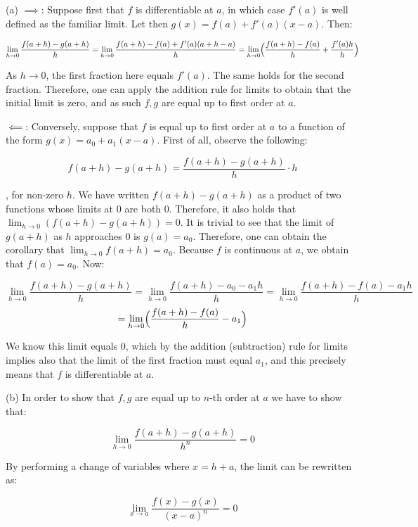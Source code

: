 \begin{solution}

    (a) $\implies$: Suppose first that $f$ is differentiable at $a$, in which case $f'(a)$ is well defined as the familiar limit. Let then $g(x) = f(a) + f'(a)(x - a)$. Then:

    $$\lim_{h \rightarrow 0} \frac{f(a + h) - g(a+h)}{h} = \lim_{h \rightarrow 0} \frac{f(a+h) - f(a) + f'(a)(a + h - a)}{h} = \lim_{h \rightarrow 0}\Bigl( \frac{f(a+h) - f(a)}{h} + \frac{f'(a)h}{h}\Bigr)$$

    As $h \rightarrow 0$, the first fraction here equals $f'(a)$. The same holds for the second fraction. Therefore, one can apply the addition rule for limits to obtain that the initial limit is zero, and as such $f, g$ are equal up to first order at $a$.

    $\impliedby$: Conversely, suppose that $f$ is equal up to first order at $a$ to a function of the form $g(x) = a_0 + a_1(x -a)$. First of all, observe the following:

    $$f(a+h) - g(a+h) = \frac{f(a+h) - g(a+h)}{h}\cdot h$$

    , for non-zero $h$. We have written $f(a+h) - g(a+h)$ as a product of two functions whose limits at 0 are both 0. Therefore, it also holds that $\lim_{h \rightarrow 0} (f(a+h) - g(a+h)) = 0$. It is trivial to see that the limit of $g(a+h)$ as $h$ approaches 0 is $g(a) = a_0$. Therefore, one can obtain the corollary that $\lim_{h \rightarrow 0} f(a+h) = a_0$. Because $f$ is continuous at $a$, we obtain that $f(a) = a_0$. Now:

    $$\lim_{h \rightarrow 0} \frac{f(a+h) - g(a+h)}{h} = \lim_{h \rightarrow 0} \frac{f(a+h) - a_0 - a_1 h}{h} = \lim_{h \rightarrow 0} \frac{f(a+h) - f(a) - a_1h}{h}$$
    $$ = \lim_{h \rightarrow 0}\Bigl( \frac{f(a+h) - f(a)}{h}  - a_1\Bigr)$$

    We know this limit equals 0, which by the addition (subtraction) rule for limits implies also that the limit of the first fraction must equal $a_1$, and this precisely means that $f$ is differentiable at $a$.

    (b) In order to show that $f, g$ are equal up to $n$-th order at $a$ we have to show that:

    $$\lim_{h \rightarrow 0} \frac{f(a+h) - g(a+h)}{h^n} = 0$$

    By performing a change of variables where $x = h + a$, the limit can be rewritten as:

    $$\lim_{x \rightarrow a} \frac{f(x) - g(x)}{(x - a)^n} = 0$$


\end{solution}
